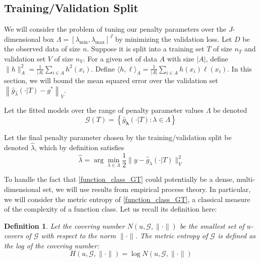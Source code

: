 \documentclass[12pt]{article}
\newtheorem{definition}{Definition}
\begin{document}
\subsection{Training/Validation Split}

We will consider the problem of tuning our penalty parameters over the $J$-dimensional box $\Lambda = [\lambda_{\min}, \lambda_{\max}]^J$ by minimizing the validation loss. Let $D$ be the observed data of size $n$. Suppose it is split into a training set $T$ of size $n_T$ and validation set $V$ of size $n_V$. For a given set of data $A$ with size $|A|$, define $\| h \|_A^2 = \frac{1}{|A|}\sum_{i\in A} h^2(x_i)$. Define $\langle h, \ell \rangle_A = \frac{1}{|A|}\sum_{i\in A} h(x_i) \ell(x_i)$. In this section, we will bound the mean squared error over the validation set $\left \|\hat{g}_{\hat{\lambda} }(\cdot | T) - g^* \right \|_V$. 

Let the fitted models over the range of penalty parameter values $\Lambda$ be denoted
\begin{equation}
\label{function_class_GT}
\mathcal{G}(T) = \left \{ \hat{g}_{\boldsymbol \lambda}(\cdot | T) : \lambda \in \Lambda  \right \}
\end{equation}

Let the final penalty parameter chosen by the training/validation split be denoted $\hat\lambda$, which by definition satisfies
\begin{equation}
\label{cv_lambda}
\hat{\lambda} = \arg\min_{\lambda\in\Lambda} \frac{1}{2}  \| y-\hat{g}_{\lambda}(\cdot | T) \|_{V}^{2}
\end{equation}

To handle the fact that \eqref{function_class_GT} could potentially be a dense, multi-dimensional set, we will use results from empirical process theory. In particular, we will consider the metric entropy of \eqref{function_class_GT}, a classical measure of the complexity of a function class. Let us recall its definition here:

\begin{definition}
Let the covering number $N(u, \mathcal{G}, \| \cdot \|)$ be the smallest set of $u$-covers of $\mathcal{G}$ with respect to the norm $\| \cdot \|$. The metric entropy of $\mathcal{G}$ is defined as the log of the covering number:
\begin{equation}
H (u, \mathcal{G}, \| \cdot \| ) = \log N(u, \mathcal{G}, \| \cdot \|)
\end{equation}
\end{definition}
\end{document}
